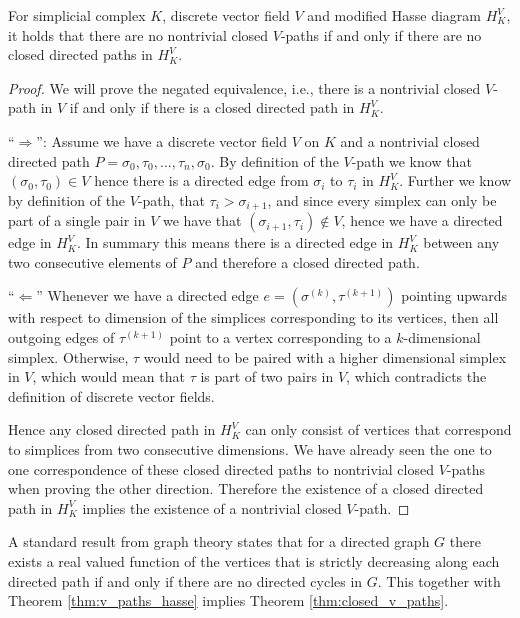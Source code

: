 \begin{thm}
\label{thm:v_paths_hasse}
For simplicial complex $K$, discrete vector field $V$ and modified Hasse diagram $H_K^V$, it holds that there are no nontrivial closed $V$-paths if and only if there are no closed directed paths in $H_K^V$. 
\end{thm}
\begin{proof}
We will prove the negated equivalence, i.e., there is a nontrivial closed $V$-path in $V$ if and only if there is a closed directed path in $H_K^V$.

\enquote{$\Rightarrow$}: Assume we have a discrete vector field $V$ on $K$ and a nontrivial closed directed path $P = \sigma_0, \tau_0, \dots ,\tau_n, \sigma_0$. By definition of the $V$-path we know that $(\sigma_0,\tau_0) \in V$ hence there is a directed edge from $\sigma_i$ to $\tau_i$ in $H_K^V$. Further we know by definition of the $V$-path, that $\tau_i > \sigma_{i+1}$, and since every simplex can only be part of a single pair in $V$ we have that $(\sigma_{i+1}, \tau_i) \notin V$, hence we have a directed edge in $H_K^V$. In summary this means there is a directed edge in $H_K^V$ between any two consecutive elements of $P$ and therefore a closed directed path. 

\enquote{$\Leftarrow$} Whenever we have a directed edge $e = (\sigma^{(k)}, \tau^{(k+1)})$ pointing upwards with respect to dimension of the simplices corresponding to its vertices, then all outgoing edges of $\tau^{(k+1)}$ point to a vertex corresponding to a $k$-dimensional simplex. Otherwise, $\tau$ would need to be paired with a higher dimensional simplex in $V$, which would mean that $\tau$ is part of two pairs in $V$, which contradicts the definition of discrete vector fields. 

Hence any closed directed path in $H_K^V$ can only consist of vertices that correspond to simplices from two consecutive dimensions. We have already seen the one to one correspondence of these closed directed paths to nontrivial closed $V$-paths when proving the other direction. Therefore the existence of a closed directed path in $H_K^V$ implies the existence of a nontrivial closed $V$-path. 
\end{proof}
A standard result from graph theory states that for a directed graph $G$ there exists a real valued function of the vertices that is strictly decreasing along each directed path if and only if there are no directed cycles in $G$. This together with Theorem \ref{thm:v_paths_hasse} implies Theorem \ref{thm:closed_v_paths}. \\

